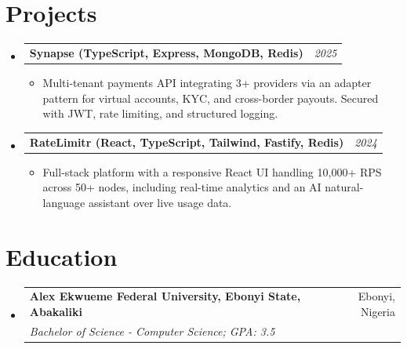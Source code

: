 \documentclass[a4paper]{article}
\makeatletter
\newcommand{\resumeSubheading}[4]{
\vspace{-1pt}
\item[]
\begin{tabular*}{0.97\textwidth}{l@{\extracolsep{\fill}}r}
	\textbf{#1} & #2          \\
	\textit{#3} & \textit{#4} \\
\end{tabular*}
\vspace{1pt}
}
\newcommand{\resumeProjectHeading}[2]{ %
\vspace{2pt}
\item[]
\begin{tabular*}{0.97\textwidth}{l@{\extracolsep{\fill}}r}
	\textbf{#1} & \textit{#2} \\
\end{tabular*}
\vspace{0pt}
}
\newcommand{\resumeSubHeadingListStart}{\begin{itemize}[leftmargin=*,topsep=1pt]}
\newcommand{\resumeSubHeadingListEnd}{\end{itemize}}
\newcommand{\resumeItemListStart}{\begin{itemize}[topsep=0pt,itemsep=0pt,parsep=0pt]}
\newcommand{\resumeItemListEnd}{\end{itemize}}
\makeatother
\begin{document}
	\section{Projects}
	\resumeSubHeadingListStart
	\resumeProjectHeading{Synapse (TypeScript, Express, MongoDB, Redis)}{2025}
	\resumeItemListStart
	\item\small{Multi-tenant payments API integrating 3+ providers via an adapter pattern for virtual accounts, KYC, and cross-border payouts. Secured with JWT, rate limiting, and structured logging.}
	\resumeItemListEnd
	\resumeProjectHeading{RateLimitr (React, TypeScript, Tailwind, Fastify, Redis)}{2024}
	\resumeItemListStart
	\item\small{Full-stack platform with a responsive React UI handling 10,000+ RPS across 50+ nodes, including real-time analytics and an AI natural-language assistant over live usage data.}
	\resumeItemListEnd
	\resumeSubHeadingListEnd

	\section{Education}
	\resumeSubHeadingListStart
	\resumeSubheading
	{Alex Ekwueme Federal University, Ebonyi State, Abakaliki}{Ebonyi, Nigeria}
	{Bachelor of Science - Computer Science; GPA: 3.5}{}
	\resumeSubHeadingListEnd
\end{document}

